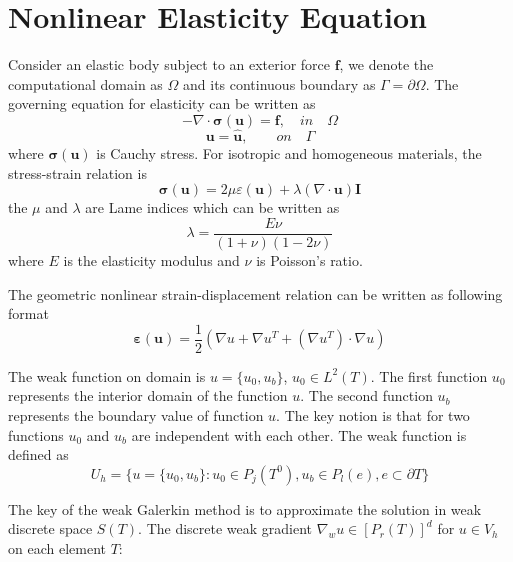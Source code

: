 \section{Nonlinear Elasticity Equation}

Consider an elastic body subject to an exterior force $ \mathbf{f} $, we denote the computational domain as $ \Omega $ and its continuous boundary as $ \Gamma = \partial \Omega $. The governing equation for elasticity can be written as
\begin{equation}
-\nabla \cdot \boldsymbol{\sigma(u)} = \mathbf{f}, \quad in \quad \Omega
\end{equation}
\begin{equation}
\mathbf{u} = \hat{\mathbf{u}},  \qquad on \quad \Gamma
\end{equation}
where $ \boldsymbol{\sigma(u)} $ is Cauchy stress. For isotropic and homogeneous materials, the stress-strain relation is
\begin{equation}
\boldsymbol{\sigma(u)} = 2\mu \varepsilon(\mathbf{u}) + \lambda (\nabla \cdot \mathbf{u}) \mathbf{I}
\end{equation}
the $ \mu $ and $ \lambda $ are Lame indices which can be written as
\begin{equation}
\lambda = \frac{E\nu}{(1 + \nu)(1 - 2\nu)}
\end{equation}
where $ E $ is the elasticity modulus and $ \nu $ is Poisson's ratio. 

The geometric nonlinear strain-displacement relation can be written as following format
\begin{equation}
\boldsymbol{\varepsilon(u)}= \frac{1}{2} (\nabla u + \nabla u^{T} + (\nabla u^{T}) \cdot \nabla u)
\end{equation}

The weak function on domain is $ u = \{u_0, u_b\} $, $ u_{0} \in L^{2} (T)$. The first function $ u_0 $ represents the interior domain of the function $ u $. The second function $ u_{b} $ represents the boundary value of function $ u $. The key notion is that for two functions $ u_0 $ and $ u_{b} $ are independent with each other. The weak function is defined as 
\begin{equation}
U_{h} = \{ u = \{u_{0}, u_{b} \}: u_{0} \in P_{j} (T^{0}), u_{b} \in P_{l} (e), e \subset \partial T \}
\end{equation}

The key of the weak Galerkin method is to approximate the solution in weak discrete space $ S(T) $. The discrete weak gradient $ \nabla_{w} u \in [P_{r} (T)]^{d} $ for $ u \in V_{h} $ on each element $ T $:

